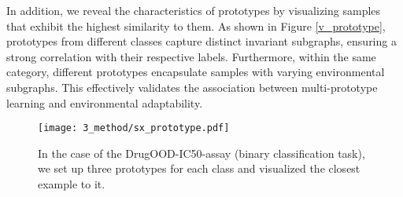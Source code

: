 In addition, we reveal the characteristics of prototypes by visualizing samples that exhibit the highest similarity to them. As shown in Figure \ref{v_prototype}, prototypes from different classes capture distinct invariant subgraphs, ensuring a strong correlation with their respective labels. Furthermore, within the same category, different prototypes encapsulate samples with varying environmental subgraphs. This effectively validates the association between multi-prototype learning and environmental adaptability.
\begin{figure*}[t!] \label{v_prototype}
\centering    
\texttt{[image: 3\_method/sx\_prototype.pdf]}
\caption{In the case of the DrugOOD-IC50-assay (binary classification task), we set up three prototypes for each class and visualized the closest example to it. }  
\label{fig:intro} 
\end{figure*}

